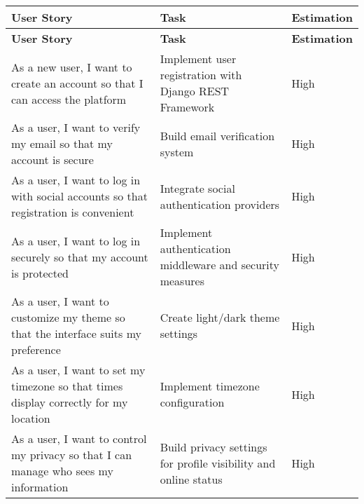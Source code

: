 \begin{table}[h]
\centering
\caption{Sprint 1 Backlog}
\begin{longtable}{|p{}|p{}|p{}|}
\hline
\textbf{User Story} & \textbf{Task} & \textbf{Estimation} \\
\hline
\endfirsthead

\hline
\textbf{User Story} & \textbf{Task} & \textbf{Estimation} \\
\hline
\endhead

As a new user, I want to create an account so that I can access the platform & Implement user registration with Django REST Framework & High \\
\hline

As a user, I want to verify my email so that my account is secure & Build email verification system & High \\
\hline

As a user, I want to log in with social accounts so that registration is convenient & Integrate social authentication providers & High \\
\hline

As a user, I want to log in securely so that my account is protected & Implement authentication middleware and security measures & High \\
\hline

As a user, I want to customize my theme so that the interface suits my preference & Create light/dark theme settings & High \\
\hline

As a user, I want to set my timezone so that times display correctly for my location & Implement timezone configuration & High \\
\hline

As a user, I want to control my privacy so that I can manage who sees my information & Build privacy settings for profile visibility and online status & High \\
\hline


\end{longtable}
\end{table}

